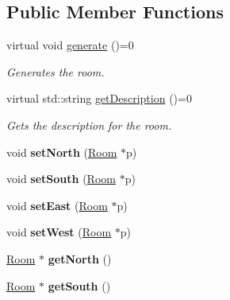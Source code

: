 \subsection*{Public Member Functions}
\begin{DoxyCompactItemize}
\item 
virtual void \hyperlink{classRoom_a3556128b8e7f544fa618576fbab4b52e}{generate} ()=0
\begin{DoxyCompactList}\small\item\em Generates the room. \item\end{DoxyCompactList}\item 
virtual std::string \hyperlink{classRoom_aacf839325fa7c6b08d21533b0780025c}{getDescription} ()=0
\begin{DoxyCompactList}\small\item\em Gets the description for the room. \item\end{DoxyCompactList}\item 
\hypertarget{classRoom_a6444c36666d393fe9c814ef88e3cd512}{
void {\bfseries setNorth} (\hyperlink{classRoom}{Room} $\ast$p)}
\label{classRoom_a6444c36666d393fe9c814ef88e3cd512}

\item 
\hypertarget{classRoom_a86d56ecdcc60c20b88ec199e1d349aea}{
void {\bfseries setSouth} (\hyperlink{classRoom}{Room} $\ast$p)}
\label{classRoom_a86d56ecdcc60c20b88ec199e1d349aea}

\item 
\hypertarget{classRoom_aacbc7cf8e8a85a6b45d5f79328939866}{
void {\bfseries setEast} (\hyperlink{classRoom}{Room} $\ast$p)}
\label{classRoom_aacbc7cf8e8a85a6b45d5f79328939866}

\item 
\hypertarget{classRoom_a27932e1f4ab75bdf01c971dedbfcfcde}{
void {\bfseries setWest} (\hyperlink{classRoom}{Room} $\ast$p)}
\label{classRoom_a27932e1f4ab75bdf01c971dedbfcfcde}

\item 
\hypertarget{classRoom_a6458d41d4cbc1f83f92396c7e0421069}{
\hyperlink{classRoom}{Room} $\ast$ {\bfseries getNorth} ()}
\label{classRoom_a6458d41d4cbc1f83f92396c7e0421069}

\item 
\hypertarget{classRoom_a1bdbb9a3d2ef350457724ef307a03b6b}{
\hyperlink{classRoom}{Room} $\ast$ {\bfseries getSouth} ()}
\label{classRoom_a1bdbb9a3d2ef350457724ef307a03b6b}


\end{DoxyCompactItemize}
